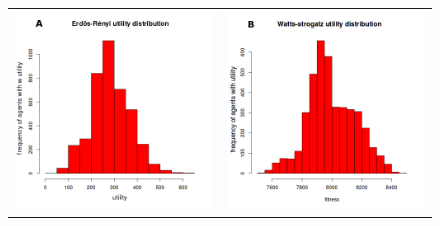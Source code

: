 \documentclass[11pt]{article}
\begin{document}
\begin{figure} [h!]
\centering
\begin{tabular}{cc}

\includegraphics[scale=0.28]{images/erdos_fitness.png} & 
\includegraphics[scale=0.28]{images/watts_fitness.png} \\

\end{tabular}
\end{figure}
\end{document}
